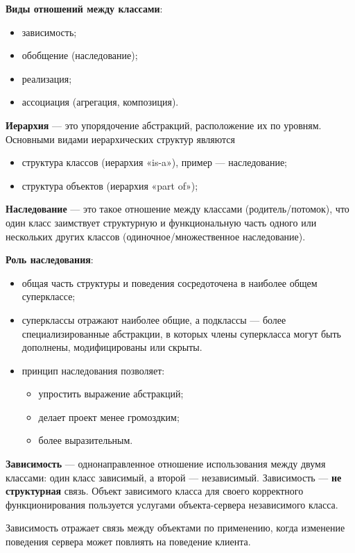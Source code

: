 \documentclass[a4paper,12pt,oneside]{extbook}
\begin{document}
\textbf{Виды отношений между классами}:
\begin{itemize}
    \item зависимость;
    \item обобщение (наследование);
    \item реализация;
    \item ассоциация (агрегация, композиция).
\end{itemize}

\textbf{Иерархия} — это упорядочение абстракций, расположение их по уровням. Основными видами иерархических структур являются
\begin{itemize}
    \item структура классов (иерархия «is-a»), пример — наследование;
    \item структура объектов (иерархия «part of»);
\end{itemize}

\textbf{Наследование} — это такое отношение между классами (родитель/потомок), что один класс заимствует структурную и функциональную часть одного или нескольких других классов (одиночное/множественное наследование).

\textbf{Роль наследования}:
\begin{itemize}
    \item общая часть структуры и поведения сосредоточена в наиболее общем суперклассе;
    \item суперклассы отражают наиболее общие, а подклассы — более специализированные абстракции, в которых члены суперкласса могут быть дополнены, модифицированы или скрыты.
    \item принцип наследования позволяет:
          \begin{itemize}
              \item упростить выражение абстракций;
              \item делает проект менее громоздким;
              \item более выразительным.
          \end{itemize}
\end{itemize}

\textbf{Зависимость} — однонаправленное отношение использования между двумя классами: один класс зависимый, а второй — независимый. Зависимость — \textbf{не структурная} связь. Объект зависимого класса для своего корректного функционирования пользуется услугами объекта-сервера независимого класса.

Зависимость отражает связь между объектами по применению, когда изменение поведения сервера может повлиять на поведение клиента.
\end{document}
